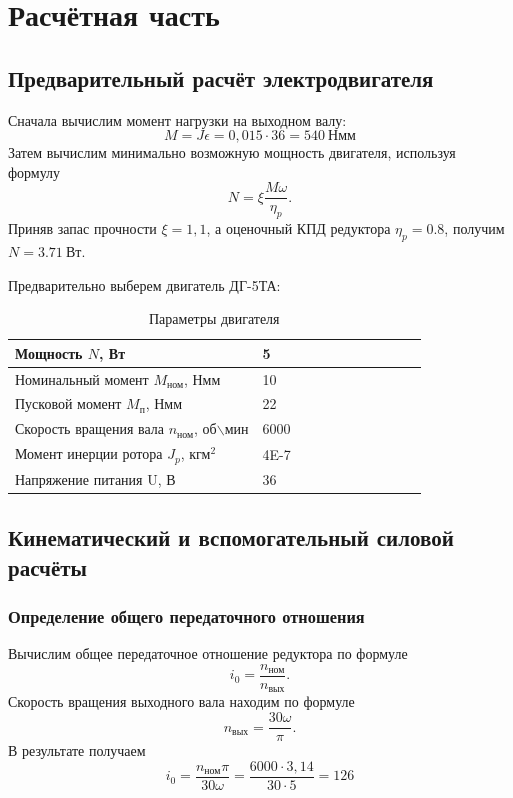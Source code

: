 \documentclass[14pt,a4paper,russian]{scrartcl}
\begin{document}
\newcommand{\Mnom}{M_{\text{ном}}}
\newcommand{\Mp}{M_{\text{п}}}
\newcommand{\nn}{n_{\text{ном}}}
\newcommand{\nv}{n_{\text{вых}}}

\setcounter{section}{1}
\section*{Расчётная часть}
\subsection{Предварительный расчёт электродвигателя}
    Сначала вычислим момент нагрузки на выходном валу:
    \[ M = J\epsilon = 0,015\cdot36 = 540\ \text{Нмм}\]
    Затем вычислим минимально возможную мощность двигателя, используя формулу
    \[ N = \xi\frac{M\omega}{\eta_p}. \]
    Приняв запас прочности \( \xi=1,1 \), а оценочный КПД редуктора \( \eta_p=0.8 \),
    получим \( N=3.71\ \text{Вт} \).

    Предварительно выберем двигатель ДГ-5ТА:
    \begin{table}[h!]
        \begin{center}
            \begin{tabular}{|p{0.6\linewidth}|p{0.4\linewidth}|}
                \hline
                Мощность \( N \), Вт & 5 \\
                \hline
                Номинальный момент \( \Mnom \), Нмм & 10 \\
                \hline
                Пусковой момент \( \Mp \), Нмм &    22 \\
                \hline
                Скорость вращения вала \( \nn \), об\( \backslash \)мин     & 6000 \\
                \hline
                Момент инерции ротора \( J_p \), \( \text{кгм}^2 \) & 4E-7 \\
                \hline
                Напряжение питания U, В & 36 \\
                \hline
            \end{tabular}
            \caption{Параметры двигателя}\label{tab:engine}
        \end{center}
    \end{table}

    \subsection{Кинематический и вспомогательный силовой расчёты}
    \subsubsection{Определение общего передаточного отношения}
        Вычислим общее передаточное отношение редуктора по формуле 
         \[ i_0 = \frac{\nn}{\nv}. \]
         Скорость вращения выходного вала находим по формуле 
          \[ \nv = \frac{30\omega}{\pi}. \]
         В результате получаем
          \[ i_0 = \frac{\nn\pi}{30\omega} = \frac{6000\cdot3,14}{30\cdot5} = 126\]
    
\end{document}
